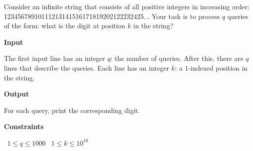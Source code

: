 Consider an infinite string that consists of all positive integers in increasing order:
12345678910111213141516171819202122232425...
Your task is to process $q$ queries of the form: what is the digit at position $k$ in the string?

\vspace{0.3cm}\noindent\textbf{Input}

The first input line has an integer $q$: the number of queries.
After this, there are $q$ lines that describe the queries. Each line has an integer $k$: a $1$-indexed position in the string.

\vspace{0.3cm}\noindent\textbf{Output}

For each query, print the corresponding digit.

\vspace{0.3cm}\noindent\textbf{Constraints}

\textbullet\ $1 \le q \le 1000$
\textbullet\ $1 \le k \le 10^{18}$